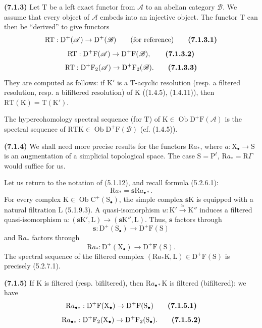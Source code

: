 \documentclass[11pt,leqno]{article}
\begin{document}
\textbf{(7.1.3)} Let \(\mathrm{T}\) be a left exact functor from \(\mathscr{A}\) to an abelian category \(\mathscr{B}\). We assume that every object of \(\mathscr{A}\) embeds into an injective object. The functor \(\mathrm{T}\) can then be “derived” to give functors
\[
\mathrm{RT}:\mathrm{D}^{+}(\mathscr{A})\to\mathrm{D}^{+}(\mathscr{B})
\qquad\text{(for reference)}
\tag*{\textbf{(7.1.3.1)}}
\]
\[
\mathrm{RT}:\mathrm{D}^{+}\mathrm{F}(\mathscr{A})
\to\mathrm{D}^{+}\mathrm{F}(\mathscr{B}),
\tag*{\textbf{(7.1.3.2)}}
\]
\[
\mathrm{RT}:\mathrm{D}^{+}\mathrm{F}_2(\mathscr{A})
\to\mathrm{D}^{+}\mathrm{F}_2(\mathscr{B}).
\tag*{\textbf{(7.1.3.3)}}
\]
They are computed as follows: if \(\mathrm{K}'\) is a \(\mathrm{T}\)-acyclic resolution (resp. a filtered resolution, resp. a bifiltered resolution) of \(\mathrm{K}\) ((1.4.5), (1.4.11)), then \(\mathrm{RT}(\mathrm{K})=\mathrm{T}(\mathrm{K}')\).

The hypercohomology spectral sequence (for \(\mathrm{T}\)) of \(\mathrm{K}\in\operatorname{Ob}\mathrm{D}^{+}\mathrm{F}(\mathscr{A})\) is the spectral sequence of \(\mathrm{RTK}\in\operatorname{Ob}\mathrm{D}^{+}\mathrm{F}(\mathscr{B})\) (cf. (1.4.5)).

\textbf{(7.1.4)} We shall need more precise results for the functors \(\mathrm{R}a_{\ast}\), where \(a:\mathrm{X}_{\bullet}\to\mathrm{S}\) is an augmentation of a simplicial topological space. The case \(\mathrm{S}=\mathrm{P}^{t}\), \(\mathrm{R}a_{\ast}=\mathrm{R}\Gamma\) would suffice for us.

Let us return to the notation of (5.1.12), and recall formula (5.2.6.1):
\[
\mathrm{R}a_{\ast}=\boldsymbol{s}\mathrm{R}a_{\bullet\ast}.
\]
For every complex \(\mathrm{K}\in\operatorname{Ob}\mathrm{C}^{+}(\mathrm{S}_{\bullet})\), the simple complex \(\boldsymbol{s}\mathrm{K}\) is equipped with a natural filtration \(\mathrm{L}\) (5.1.9.3). A quasi-isomorphism \(u:\mathrm{K}'\xrightarrow{\approx}\mathrm{K}''\) induces a filtered quasi-isomorphism \(u:(\boldsymbol{s}\mathrm{K}',\mathrm{L})\to(\boldsymbol{s}\mathrm{K}'',\mathrm{L})\). Thus, \(\boldsymbol{s}\) factors through
\[
\boldsymbol{s}:\mathrm{D}^{+}(\mathrm{S}_{\bullet})
\to\mathrm{D}^{+}\mathrm{F}(\mathrm{S})
\]
and \(\mathrm{R}a_{\ast}\) factors through
\[
\mathrm{R}a_{\ast}:\mathrm{D}^{+}(\mathrm{X}_{\bullet})
\to\mathrm{D}^{+}\mathrm{F}(\mathrm{S}).
\]
The spectral sequence of the filtered complex \((\mathrm{R}a_{\ast}\mathrm{K},\mathrm{L})\in\mathrm{D}^{+}\mathrm{F}(\mathrm{S})\) is precisely (5.2.7.1).

\textbf{(7.1.5)} If \(\mathrm{K}\) is filtered (resp. bifiltered), then \(\mathrm{R}a_{\bullet\ast}\mathrm{K}\) is filtered (bifiltered): we have
\[
\mathrm{R}a_{\bullet\ast}:
\mathrm{D}^{+}\mathrm{F}(\mathrm{X}_{\bullet})
\to\mathrm{D}^{+}\mathrm{F}(\mathrm{S}_{\bullet})
\tag*{\textbf{(7.1.5.1)}}
\]
\[
\mathrm{R}a_{\bullet\ast}:
\mathrm{D}^{+}\mathrm{F}_2(\mathrm{X}_{\bullet})
\to\mathrm{D}^{+}\mathrm{F}_2(\mathrm{S}_{\bullet}).
\tag*{\textbf{(7.1.5.2)}}
\]
\end{document}

